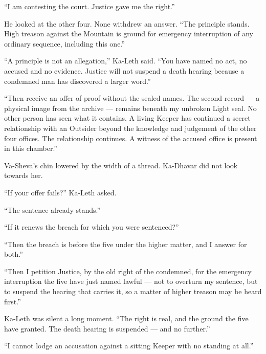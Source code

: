 ``I am contesting the court. Justice gave me the right.''\par

He looked at the other four. None withdrew an answer. ``The principle stands. High treason against the Mountain is ground for emergency interruption of any ordinary sequence, including this one.''\par

``A principle is not an allegation,'' Ka-Leth said. ``You have named no act, no accused and no evidence. Justice will not suspend a death hearing because a condemned man has discovered a larger word.''\par

``Then receive an offer of proof without the sealed names. The second record --- a physical image from the archive --- remains beneath my unbroken Light seal. No other person has seen what it contains. A living Keeper has continued a secret relationship with an Outsider beyond the knowledge and judgement of the other four offices. The relationship continues. A witness of the accused office is present in this chamber.''\par

Va-Sheva's chin lowered by the width of a thread. Ka-Dhavar did not look towards her.\par

``If your offer fails?'' Ka-Leth asked.\par

``The sentence already stands.''\par

``If it renews the breach for which you were sentenced?''\par

``Then the breach is before the five under the higher matter, and I answer for both.''\par

``Then I petition Justice, by the old right of the condemned, for the emergency interruption the five have just named lawful --- not to overturn my sentence, but to suspend the hearing that carries it, so a matter of higher treason may be heard first.''\par

Ka-Leth was silent a long moment. ``The right is real, and the ground the five have granted. The death hearing is suspended --- and no further.''\par

``I cannot lodge an accusation against a sitting Keeper with no standing at all.''\par

